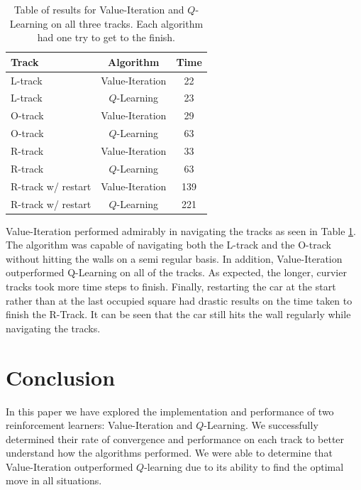 \documentclass{article}
\begin{document}
				\begin{table}
					\centering
					\begin{tabular}{|l|c|c|}
						\hline
						Track & Algorithm & Time \\ \hline
						L-track & Value-Iteration & 22 \\ 
						L-track & $Q$-Learning & 23 \\ 
						O-track & Value-Iteration & 29 \\
						O-track & $Q$-Learning & 63 \\
						R-track & Value-Iteration & 33 \\
						R-track & $Q$-Learning & 63 \\
						R-track w/ restart & Value-Iteration & 139\\
						R-track w/ restart & $Q$-Learning & 221  \\ \hline
						
					\end{tabular}
					\caption{Table of results for Value-Iteration and $Q$-Learning on all three tracks. Each algorithm had one try to get to the finish.}
					\label{results}
				\end{table}
				
				Value-Iteration performed admirably in navigating the tracks as seen in Table \ref{results}. The algorithm was capable of navigating both the L-track and the O-track without hitting the walls on a semi regular basis. In addition, Value-Iteration outperformed Q-Learning on all of the tracks. As expected, the longer, curvier tracks took more time steps to finish. Finally, restarting the car at the start rather than at the last occupied square had drastic results on the time taken to finish the R-Track. It can be seen that the car still hits the wall regularly while navigating the tracks.


	\section{Conclusion}
    In this paper we have explored the implementation and performance of two reinforcement learners: Value-Iteration and $Q$-Learning. We successfully determined their rate of convergence and performance on each track to better understand how the algorithms performed. We were able to determine that Value-Iteration outperformed $Q$-learning due to its ability to find the optimal move in all situations. 

		
	
\end{document}
